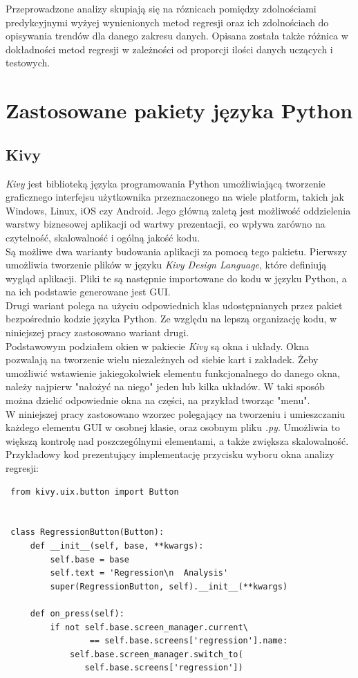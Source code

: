 Przeprowadzone analizy skupiają się na róznicach pomiędzy zdolnościami predykcyjnymi wyżyej wynienionych metod regresji oraz ich zdolnościach do opisywania trendów dla danego zakresu danych.
Opisana została także różnica w dokładności metod regresji w zależności od proporcji ilości danych uczących i testowych.


\section{Zastosowane pakiety języka Python}

\subsection{Kivy}
\textit{Kivy} jest biblioteką języka programowania Python umożliwiającą tworzenie graficznego interfejsu użytkownika przeznaczonego na wiele platform, takich jak Windows, Linux, iOS czy Android.
Jego główną zaletą jest możliwość oddzielenia warstwy biznesowej aplikacji od wartwy prezentacji, co wpływa zarówno na czytelność, skalowalność i ogólną jakość kodu.\\

Są możliwe dwa warianty budowania aplikacji za pomocą tego pakietu. Pierwszy umożliwia tworzenie plików w języku \textit{Kivy Design Language}, które definiują wygląd aplikacji.
Pliki te są następnie importowane do kodu w języku Python, a na ich podstawie generowane jest GUI.\\

Drugi wariant polega na użyciu odpowiednich klas udostępnianych przez pakiet bezpośrednio kodzie języka Python. Ze względu na lepszą organizację kodu, w niniejszej pracy zastosowano wariant drugi.\\

Podstawowym podziałem okien w pakiecie \textit{Kivy} są okna i układy.
Okna pozwalają na tworzenie wielu niezależnych od siebie kart i zakładek. Żeby umożliwić wstawienie jakiegokolwiek elementu funkcjonalnego do danego okna, należy najpierw "nałożyć na niego" jeden lub kilka układów.
W taki sposób można dzielić odpowiednie okna na części, na przykład tworząc "menu".\\

W niniejszej pracy zastosowano wzorzec polegający na tworzeniu i umieszczaniu każdego elementu GUI w osobnej klasie, oraz osobnym pliku \textit{.py}. Umożliwia to większą kontrolę nad poszczególnymi elementami, a także zwiększa skalowalność.\\
Przykładowy kod prezentujący implementację przycisku wyboru okna analizy regresji:
\begin{lstlisting}
 from kivy.uix.button import Button


 class RegressionButton(Button):
     def __init__(self, base, **kwargs):
         self.base = base
         self.text = 'Regression\n  Analysis'
         super(RegressionButton, self).__init__(**kwargs)
 
     def on_press(self):
         if not self.base.screen_manager.current\
                 == self.base.screens['regression'].name:
             self.base.screen_manager.switch_to(
			    self.base.screens['regression'])
\end{lstlisting}



